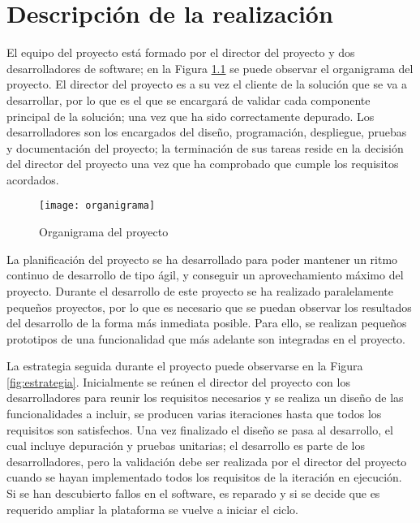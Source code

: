 \chapter{Descripción de la realización}
El equipo del proyecto está formado por el director del proyecto y dos
desarrolladores de software; en la Figura \ref{fig:organigrama} se puede
observar el organigrama del proyecto. El director del proyecto es a su vez el
cliente de la solución que se va a desarrollar, por lo que es el que se
encargará de validar cada componente principal de la solución; una vez que ha
sido correctamente depurado. Los desarrolladores son los encargados del diseño,
programación, despliegue, pruebas y documentación del proyecto; la terminación
de sus tareas reside en la decisión del director del proyecto una vez que ha
comprobado que cumple los requisitos acordados.

\begin{figure}[H]
	\begin{center}
		\texttt{[image: organigrama]}
		\caption{Organigrama del proyecto}
		\label{fig:organigrama}
	\end{center}
\end{figure}

La planificación del proyecto se ha desarrollado para poder mantener un ritmo
continuo de desarrollo de tipo ágil, y conseguir un aprovechamiento máximo del
proyecto. Durante el desarrollo de este proyecto se ha realizado paralelamente
pequeños proyectos, por lo que es  necesario que se puedan observar los
resultados del desarrollo de la forma más inmediata posible. Para ello, se
realizan pequeños prototipos de una funcionalidad que más adelante son
integradas en el proyecto.

La estrategia seguida durante el proyecto puede observarse en la Figura
\ref{fig:estrategia}. Inicialmente se reúnen el director del proyecto con
los desarrolladores para reunir los requisitos necesarios y se realiza un
diseño de las funcionalidades a incluir, se producen varias iteraciones hasta
que todos los requisitos son satisfechos. Una vez finalizado el diseño se pasa
al desarrollo, el cual incluye depuración y pruebas unitarias; el desarrollo
es parte de los desarrolladores, pero la validación debe ser realizada por el
director del proyecto cuando se hayan implementado todos los requisitos de la
iteración en ejecución. Si se han descubierto fallos en el software, es
reparado y si se decide que es requerido ampliar la plataforma se vuelve a
iniciar el ciclo.

